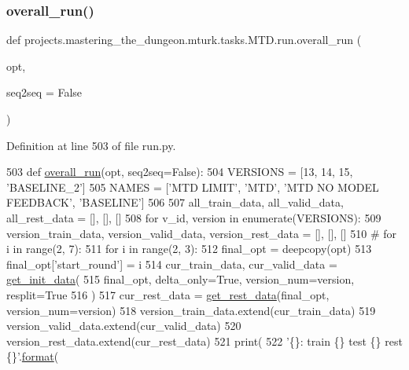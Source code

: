 \subsubsection{\texorpdfstring{overall\+\_\+run()}{overall\_run()}}
{\footnotesize\ttfamily def projects.\+mastering\+\_\+the\+\_\+dungeon.\+mturk.\+tasks.\+M\+T\+D.\+run.\+overall\+\_\+run (\begin{DoxyParamCaption}\item[{}]{opt,  }\item[{}]{seq2seq = {\ttfamily False} }\end{DoxyParamCaption})}



Definition at line 503 of file run.\+py.


\begin{DoxyCode}
503 \textcolor{keyword}{def }\hyperlink{namespaceprojects_1_1mastering__the__dungeon_1_1mturk_1_1tasks_1_1MTD_1_1run_a55b47a72699011efdf0578b82e34083c}{overall\_run}(opt, seq2seq=False):
504     VERSIONS = [13, 14, 15, \textcolor{stringliteral}{'BASELINE\_2'}]
505     NAMES = [\textcolor{stringliteral}{'MTD LIMIT'}, \textcolor{stringliteral}{'MTD'}, \textcolor{stringliteral}{'MTD NO MODEL FEEDBACK'}, \textcolor{stringliteral}{'BASELINE'}]
506 
507     all\_train\_data, all\_valid\_data, all\_rest\_data = [], [], []
508     \textcolor{keywordflow}{for} v\_id, version \textcolor{keywordflow}{in} enumerate(VERSIONS):
509         version\_train\_data, version\_valid\_data, version\_rest\_data = [], [], []
510         \textcolor{comment}{# for i in range(2, 7):}
511         \textcolor{keywordflow}{for} i \textcolor{keywordflow}{in} range(2, 3):
512             final\_opt = deepcopy(opt)
513             final\_opt[\textcolor{stringliteral}{'start\_round'}] = i
514             cur\_train\_data, cur\_valid\_data = \hyperlink{namespaceprojects_1_1mastering__the__dungeon_1_1mturk_1_1tasks_1_1MTD_1_1run_ae84843b54586b020d47c60d95340e1d7}{get\_init\_data}(
515                 final\_opt, delta\_only=\textcolor{keyword}{True}, version\_num=version, resplit=\textcolor{keyword}{True}
516             )
517             cur\_rest\_data = \hyperlink{namespaceprojects_1_1mastering__the__dungeon_1_1mturk_1_1tasks_1_1MTD_1_1run_ae9acbe1fe240a624b01fed3f073cc780}{get\_rest\_data}(final\_opt, version\_num=version)
518             version\_train\_data.extend(cur\_train\_data)
519             version\_valid\_data.extend(cur\_valid\_data)
520             version\_rest\_data.extend(cur\_rest\_data)
521         print(
522             \textcolor{stringliteral}{'\{\}: train \{\} test \{\} rest \{\}'}.\hyperlink{namespaceparlai_1_1chat__service_1_1services_1_1messenger_1_1shared__utils_a32e2e2022b824fbaf80c747160b52a76}{format}(

\end{DoxyCode}
